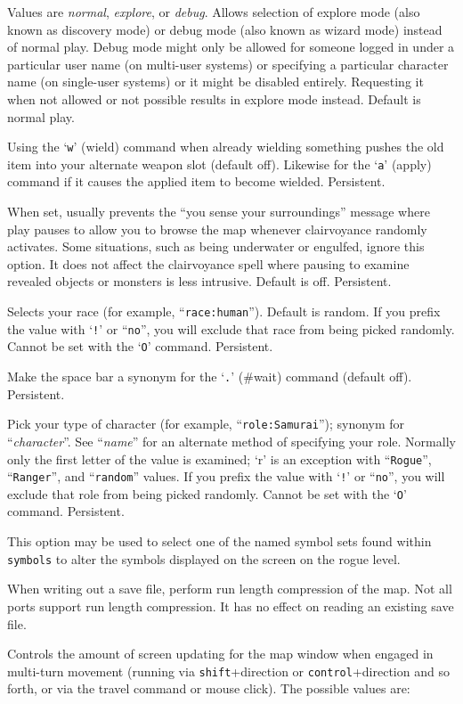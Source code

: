 \item[\ib{playmode}]
Values are {\it normal\/}, {\it explore\/}, or {\it debug\/}.
Allows selection of explore mode (also known as discovery mode) or debug
mode (also known as wizard mode) instead of normal play.
Debug mode might only be allowed for someone logged in under a particular
user name (on multi-user systems) or specifying a particular character
name (on single-user systems) or it might be disabled entirely.  Requesting
it when not allowed or not possible results in explore mode instead.
Default is normal play.
\item[\ib{pushweapon}]
Using the `{\tt w}' (wield) command when already wielding
something pushes the old item into your alternate weapon slot (default off).
Likewise for the `{\tt a}' (apply) command if it causes the applied item to
become wielded.  Persistent.
\item[\ib{quick\verb+_+farsight}]
When set, usually prevents the ``you sense your surroundings'' message
where play pauses to allow you to browse the map whenever clairvoyance
randomly activates.
Some situations, such as being underwater or engulfed, ignore this option.
It does not affect the clairvoyance spell where pausing to examine revealed
objects or monsters is less intrusive.
Default is off.  Persistent.
\item[\ib{race}]
Selects your race (for example, ``{\tt race:human}'').  Default is random.
If you prefix the value with `{\tt !}' or ``{\tt no}'', you will
exclude that race from being picked randomly.
Cannot be set with the `{\tt O}' command.  Persistent.
\item[\ib{rest\verb+_+on\verb+_+space}]
Make the space bar a synonym for the `{\tt .}' (\#wait) command (default off).
Persistent.
\item[\ib{role}]
Pick your type of character (for example, ``{\tt role:Samurai}'');
synonym for ``{\it character\/}''.  See ``{\it name\/}'' for an alternate method
of specifying your role.  Normally only the first letter of the
value is examined; `r' is an exception with ``{\tt Rogue}'', ``{\tt Ranger}'',
and ``{\tt random}'' values.
If you prefix the value with `{\tt !}' or ``{\tt no}'', you will
exclude that role from being picked randomly.
Cannot be set with the `{\tt O}' command.  Persistent.
\item[\ib{roguesymset}]
This option may be used to select one of the named symbol sets found within
{\tt symbols} to alter the symbols displayed on the screen on the
rogue level.
\item[\ib{rlecomp}]
When writing out a save file, perform run length compression of the map.
Not all ports support run length compression. It has no
effect on reading an existing save file.
\item[\ib{runmode}]
Controls the amount of screen updating for the map window when engaged
in multi-turn movement (running via {\tt shift}+direction
or {\tt control}+direction
and so forth, or via the travel command or mouse click).
The possible values are:


